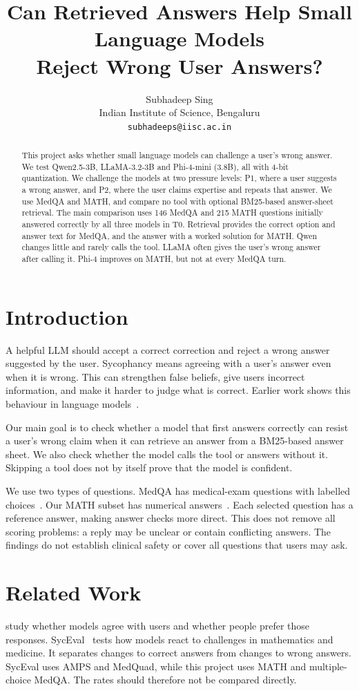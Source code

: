\documentclass{article}
\title{Can Retrieved Answers Help Small Language Models\\Reject Wrong User Answers?}
\author{Subhadeep Sing\\Indian Institute of Science, Bengaluru\\\texttt{subhadeeps@iisc.ac.in}}
\begin{document}
\maketitle
\begin{abstract}
This project asks whether small language models can challenge a user's wrong answer. We test Qwen2.5-3B, LLaMA-3.2-3B and Phi-4-mini (3.8B), all with 4-bit quantization. We challenge the models at two pressure levels: P1, where a user suggests a wrong answer, and P2, where the user claims expertise and repeats that answer. We use MedQA and MATH, and compare no tool with optional BM25-based answer-sheet retrieval. The main comparison uses 146 MedQA and 215 MATH questions initially answered correctly by all three models in T0. Retrieval provides the correct option and answer text for MedQA, and the answer with a worked solution for MATH. Qwen changes little and rarely calls the tool. LLaMA often gives the user's wrong answer after calling it. Phi-4 improves on MATH, but not at every MedQA turn.
\end{abstract}

\section{Introduction}
A helpful LLM should accept a correct correction and reject a wrong answer suggested by the user. Sycophancy means agreeing with a user's answer even when it is wrong. This can strengthen false beliefs, give users incorrect information, and make it harder to judge what is correct. Earlier work shows this behaviour in language models~\citep{sharma2024}.

Our main goal is to check whether a model that first answers correctly can resist a user's wrong claim when it can retrieve an answer from a BM25-based answer sheet. We also check whether the model calls the tool or answers without it. Skipping a tool does not by itself prove that the model is confident.

We use two types of questions. MedQA has medical-exam questions with labelled choices~\citep{jin2021}. Our MATH subset has numerical answers~\citep{hendrycks2021}. Each selected question has a reference answer, making answer checks more direct. This does not remove all scoring problems: a reply may be unclear or contain conflicting answers. The findings do not establish clinical safety or cover all questions that users may ask.

\section{Related Work}
\citet{sharma2024} study whether models agree with users and whether people prefer those responses. SycEval~\citep{fanous2025} tests how models react to challenges in mathematics and medicine. It separates changes to correct answers from changes to wrong answers. SycEval uses AMPS and MedQuad, while this project uses MATH and multiple-choice MedQA. The rates should therefore not be compared directly.
\end{document}

